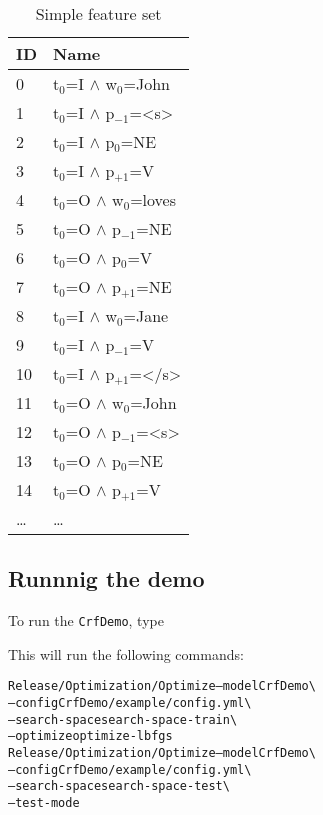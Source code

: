 \documentclass[12pt]{article}
\begin{document}
\begin{table}[h]
  \centering
  \begin{small}
  \begin{tabular}[h]{ l | l }
    ID & Name \\\hline
    0 & t$_0$=I $\land$ w$_0$=John\\
    1 & t$_0$=I $\land$ p$_{-1}$=<s>\\
    2 & t$_0$=I $\land$ p$_{0}$=NE\\
    3 & t$_0$=I $\land$ p$_{+1}$=V\\
    4 & t$_0$=O $\land$ w$_{0}$=loves\\
    5 & t$_0$=O $\land$ p$_{-1}$=NE\\
    6 & t$_0$=O $\land$ p$_{0}$=V\\
    7 & t$_0$=O $\land$ p$_{+1}$=NE\\
    8 & t$_0$=I $\land$ w$_{0}$=Jane\\
    9 & t$_0$=I $\land$ p$_{-1}$=V\\
    10 & t$_0$=I $\land$ p$_{+1}$=</s>\\
    11 & t$_0$=O $\land$ w$_0$=John\\
    12 & t$_0$=O $\land$ p$_{-1}$=<s>\\
    13 & t$_0$=O $\land$ p$_{0}$=NE\\
    14 & t$_0$=O $\land$ p$_{+1}$=V\\
    \dots & \dots
  \end{tabular}
  \end{small}
  \caption{Simple feature set}
  \label{tab:features}
\end{table}

\subsection{Runnnig the demo}

To run the \texttt{CrfDemo}, type


This will run the following commands:

\begin{mdframed}\footnotesize\begin{alltt}
Release/Optimization/Optimize --model CrfDemo \textbackslash
  --config CrfDemo/example/config.yml \textbackslash
  --search-space search-space-train \textbackslash
  --optimize optimize-lbfgs
Release/Optimization/Optimize --model CrfDemo \textbackslash
  --config CrfDemo/example/config.yml \textbackslash
  --search-space search-space-test \textbackslash
  --test-mode
\end{alltt}\end{mdframed}
\end{document}
